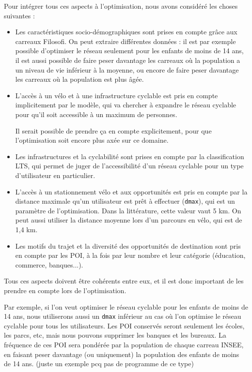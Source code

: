 \documentclass[a4paper,12pt,french]{article}
\begin{document}
Pour intégrer tous ces aspects à l'optimisation, nous avons considéré les choses suivantes :
\begin{itemize}
    \item Les caractéristiques socio-démographiques sont prises en compte grâce aux carreaux Filosofi. On peut extraire différentes données : il est par exemple possible d'optimiser le réseau seulement pour les enfants de moins de 14 ans, il est aussi possible de faire peser davantage les carreaux où la population a un niveau de vie inférieur à la moyenne, ou encore de faire peser davantage les carreaux où la population est plus âgée.

    \item L'accès à un vélo et à une infrastructure cyclable est pris en compte implicitement par le modèle, qui va chercher à expandre le réseau cyclable pour qu'il soit accessible à un maximum de personnes. 
    
    Il serait possible de prendre ça en compte explicitement, pour que l'optimisation soit encore plus axée sur ce domaine.

    \item Les infrastructures et la cyclabilité sont prises en compte par la classification LTS, qui permet de juger de l'accessibilité d'un réseau cyclable pour un type d'utilisateur en particulier.
    \item L'accès à un stationnement vélo et aux opportunités est pris en compte par la distance maximale qu'un utilisateur est prêt à effectuer (\texttt{dmax}), qui est un paramètre de l'optimisation. Dans la littérature, cette valeur vaut 5 km. On peut aussi utiliser la distance moyenne lors d'un parcours en vélo, qui est de 1,4 km. 
    \item Les motifs du trajet et la diversité des opportunités de destination sont pris en compte par les POI, à la fois par leur nombre et leur catégorie (éducation, commerce, banques...).
\end{itemize}

Tous ces aspects doivent être cohérents entre eux, et il est donc important de les prendre en compte lors de l'optimisation. 

Par exemple, si l'on veut optimiser le réseau cyclable pour les enfants de moins de 14 ans, nous utiliserons aussi un \texttt{dmax} inférieur au cas où l'on optimise le réseau cyclable pour tous les utilisateurs. Les POI conservés seront seulement les écoles, les parcs, etc, mais nous pouvons supprimer les banques et les bureaux. La fréquence de ces POI sera pondérée par la population de chaque carreau INSEE, en faisant peser davantage (ou uniquement) la population des enfants de moins de 14 ans. (juste un exemple pcq pas de programme de ce type)
\end{document}
